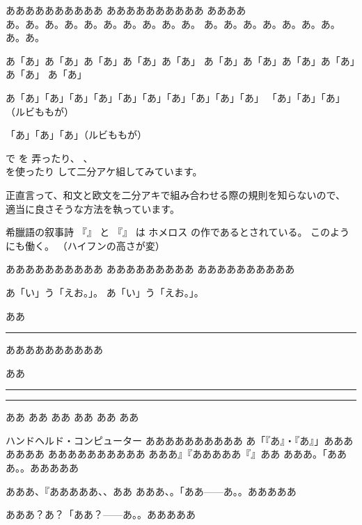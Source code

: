 \documentclass[12pt,landscape,hiragino-pro]{ltjtarticle}
\begin{document}
ああああああああああ
あああああああああ\allowbreak あ
ああああ\\
あ。あ。あ。あ。あ。あ。あ。あ。あ。あ。
あ。あ。あ。あ。あ。あ。あ。あ。あ。

あ「あ」あ「あ」あ「あ」あ「あ」あ「あ」
あ「あ」あ「あ」あ「あ」あ「あ」あ「あ」
あ「あ」

あ「あ」「あ」「あ」「あ」「あ」「あ」「あ」「あ」「あ」「あ」
「あ」「あ」「あ」（ルビももが）

「あ」「あ」「あ」（ルビももが）

で
を
弄ったり、
、\\
を使ったり
して二分アケ組してみています。

正直言って、和文と欧文を二分アキで組み合わせる際の規則を知らないので、
適当に良さそうな方法を執っています。


希臘語の叙事詩
『』%
と
『』%
は
ホメロス%
の作であるとされている。
このようにも働く。
（ハイフンの高さが変）


ああああああああああ%
あああああああああ%
ああああああああああ%

あ「い」う「えお。」。
あ「い」う「えお。」。

ああ\rule{\zw}{1pt}%
ああああああああああ

ああ\rule{\intcalcShr{\zw} sp}{1pt}\rule{\intcalcSub{\zw}{\intcalcShr{\zw}} sp}{1pt}%
ああ\sibuNoalign{}%
ああ%
ああ%
ああ%
ああ%
ああ%

ハンドヘルド・コンピューター
ああああああああああ
あ「『あ』・『あ』」あああああああ
ああああああああああ
あああ』『あああああ『』ああ
あああ。「あああ。。あああああ

あああ、『あああああ、、ああ
あああ、。「ああ——あ。。あああああ

あああ？あ？「ああ？——あ。。あああああ
\end{document}
